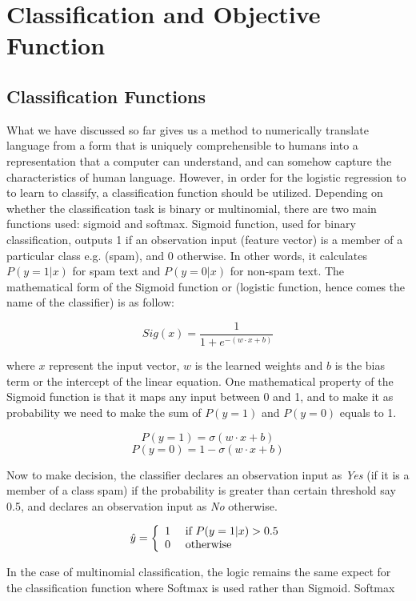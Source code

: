 \section{Classification and Objective Function}
\subsection{Classification Functions}
What we have discussed so far gives us a method to numerically translate language from a form that is uniquely comprehensible to humans into a representation that a computer can understand, and can somehow capture the characteristics of human language. However, in order for the logistic regression to to learn to classify, a classification function should be utilized. Depending on whether the classification task is binary or multinomial, there are two main functions used: sigmoid and softmax. Sigmoid function, used for binary classification, outputs 1 if an observation input (feature vector) is a member of a particular class e.g. (spam), and 0 otherwise. In other words, it calculates $P(y=1|x)$ for spam text and $P(y=0|x)$ for non-spam text. The mathematical form of the Sigmoid function or (logistic function, hence comes the name of the classifier) is as follow:

$$Sig ( x ) = \frac { 1 } { 1 + e ^ { - (w \cdot x +b)} }$$ 

where $x$ represent the input vector, $w$ is the learned weights and $b$ is the bias term or the intercept of the linear equation. One mathematical property of the Sigmoid function is that it maps any input between 0 and 1, and to make it as probability we need to make the sum of $P(y=1)$ and $P(y=0)$ equals to 1. 

$$ P ( y = 1 ) = \sigma ( w \cdot x + b ) $$
$$ P ( y = 0 ) = 1 - \sigma ( w \cdot x + b ) $$

Now to make decision, the classifier declares an observation input as \emph{Yes} (if it is a member of a class spam) if the probability is greater than certain threshold say 0.5, and declares an observation input as \emph{No} otherwise. 

$$  \hat { y } = \left\{ \begin{array} { l l } { 1 } & { \text { if } P ( y = 1 | x ) > 0.5 } \\ { 0 } & { \text { otherwise } } \end{array} \right.  $$


In the case of multinomial classification, the logic remains the same expect for the classification function where Softmax is used rather than Sigmoid. Softmax 

